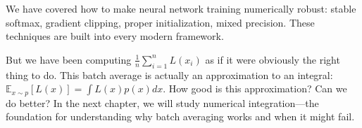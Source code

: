 
 We have covered how to make neural network training numerically robust: stable softmax, gradient clipping, proper initialization, mixed precision. These techniques are built into every modern framework.

But we have been computing $\frac{1}{n}\sum_{i=1}^n L(x_i)$ as if it were obviously the right thing to do. This batch average is actually an approximation to an integral: $\mathbb{E}_{x \sim p}[L(x)] = \int L(x) p(x) dx$. How good is this approximation? Can we do better? In the next chapter, we will study numerical integration---the foundation for understanding why batch averaging works and when it might fail.



